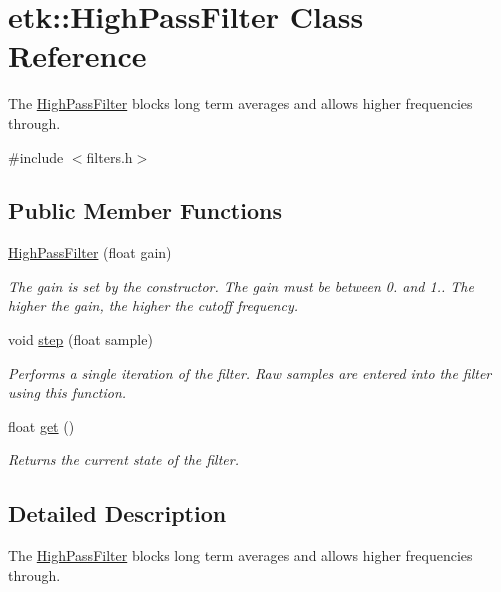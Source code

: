 \hypertarget{classetk_1_1_high_pass_filter}{\section{etk\-:\-:High\-Pass\-Filter Class Reference}
\label{classetk_1_1_high_pass_filter}
}


The \hyperlink{classetk_1_1_high_pass_filter}{High\-Pass\-Filter} blocks long term averages and allows higher frequencies through.  




{\ttfamily \#include $<$filters.\-h$>$}

\subsection*{Public Member Functions}
\begin{DoxyCompactItemize}
\item 
\hyperlink{classetk_1_1_high_pass_filter_a4aeeef21e744faf88b362396689cfac3}{High\-Pass\-Filter} (float gain)
\begin{DoxyCompactList}\small\item\em The gain is set by the constructor. The gain must be between 0. and 1.. The higher the gain, the higher the cutoff frequency. \end{DoxyCompactList}\item 
void \hyperlink{classetk_1_1_high_pass_filter_afb3dc39c0776b42f3baa60206837b145}{step} (float sample)
\begin{DoxyCompactList}\small\item\em Performs a single iteration of the filter. Raw samples are entered into the filter using this function. \end{DoxyCompactList}\item 
float \hyperlink{classetk_1_1_high_pass_filter_a2976e0cb1eaaeac3400339461f3115d5}{get} ()
\begin{DoxyCompactList}\small\item\em Returns the current state of the filter. \end{DoxyCompactList}\end{DoxyCompactItemize}


\subsection{Detailed Description}
The \hyperlink{classetk_1_1_high_pass_filter}{High\-Pass\-Filter} blocks long term averages and allows higher frequencies through. 


